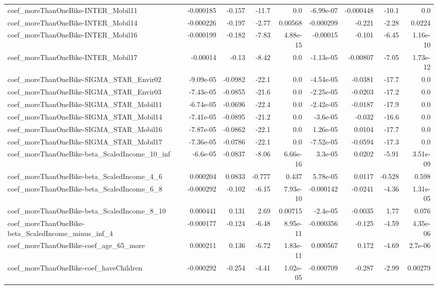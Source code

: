 \begin{tabular}{lrrrrrrrr}
coef_moreThanOneBike-INTER_Mobil11 & -0.000185 & -0.157 & -11.7 & 0.0 & -6.99e-07 & -0.000448 & -10.1 & 0.0 \\
coef_moreThanOneBike-INTER_Mobil14 & -0.000226 & -0.197 & -2.77 & 0.00568 & -0.000299 & -0.221 & -2.28 & 0.0224 \\
coef_moreThanOneBike-INTER_Mobil16 & -0.000199 & -0.182 & -7.83 & 4.88e-15 & -0.00015 & -0.101 & -6.45 & 1.16e-10 \\
coef_moreThanOneBike-INTER_Mobil17 & -0.00014 & -0.13 & -8.42 & 0.0 & -1.13e-05 & -0.00807 & -7.05 & 1.73e-12 \\
coef_moreThanOneBike-SIGMA_STAR_Envir02 & -9.09e-05 & -0.0982 & -22.1 & 0.0 & -4.54e-05 & -0.0381 & -17.7 & 0.0 \\
coef_moreThanOneBike-SIGMA_STAR_Envir03 & -7.43e-05 & -0.0855 & -21.6 & 0.0 & -2.25e-05 & -0.0203 & -17.2 & 0.0 \\
coef_moreThanOneBike-SIGMA_STAR_Mobil11 & -6.74e-05 & -0.0696 & -22.4 & 0.0 & -2.42e-05 & -0.0187 & -17.9 & 0.0 \\
coef_moreThanOneBike-SIGMA_STAR_Mobil14 & -7.41e-05 & -0.0895 & -21.2 & 0.0 & -3.6e-05 & -0.032 & -16.6 & 0.0 \\
coef_moreThanOneBike-SIGMA_STAR_Mobil16 & -7.87e-05 & -0.0862 & -22.1 & 0.0 & 1.26e-05 & 0.0104 & -17.7 & 0.0 \\
coef_moreThanOneBike-SIGMA_STAR_Mobil17 & -7.36e-05 & -0.0786 & -22.1 & 0.0 & -7.52e-05 & -0.0594 & -17.3 & 0.0 \\
coef_moreThanOneBike-beta_ScaledIncome_10_inf & -6.6e-05 & -0.0837 & -8.06 & 6.66e-16 & 3.3e-05 & 0.0202 & -5.91 & 3.51e-09 \\
coef_moreThanOneBike-beta_ScaledIncome_4_6 & 0.000204 & 0.0833 & -0.777 & 0.437 & 5.78e-05 & 0.0117 & -0.528 & 0.598 \\
coef_moreThanOneBike-beta_ScaledIncome_6_8 & -0.000292 & -0.102 & -6.15 & 7.93e-10 & -0.000142 & -0.0241 & -4.36 & 1.31e-05 \\
coef_moreThanOneBike-beta_ScaledIncome_8_10 & 0.000441 & 0.131 & 2.69 & 0.00715 & -2.4e-05 & -0.0035 & 1.77 & 0.076 \\
coef_moreThanOneBike-beta_ScaledIncome_minus_inf_4 & -0.000177 & -0.124 & -6.48 & 8.95e-11 & -0.000356 & -0.125 & -4.59 & 4.35e-06 \\
coef_moreThanOneBike-coef_age_65_more & 0.000211 & 0.136 & -6.72 & 1.83e-11 & 0.000567 & 0.172 & -4.69 & 2.7e-06 \\
coef_moreThanOneBike-coef_haveChildren & -0.000292 & -0.254 & -4.41 & 1.02e-05 & -0.000709 & -0.287 & -2.99 & 0.00279 \\

\end{tabular}
